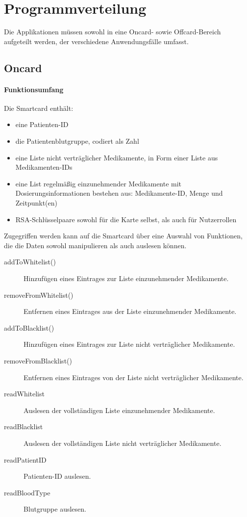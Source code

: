 \documentclass[parskip]{scrartcl}
\begin{document}
	\section{Programmverteilung}
		Die Applikationen müssen sowohl in eine Oncard- sowie Offcard-Bereich aufgeteilt werden, der verschiedene Anwendungsfälle umfasst.

		\subsection{Oncard}
		
			\paragraph{Funktionsumfang}
			Die Smartcard enthält:
			
			\begin{itemize}
				\item eine Patienten-ID
				\item die Patientenblutgruppe, codiert als Zahl
				\item eine Liste nicht verträglicher Medikamente, in Form einer Liste aus Medikamenten-IDs
				\item eine List regelmäßig einzunehmender Medikamente mit Dosierungsinformationen bestehen aus: Medikamente-ID, Menge und Zeitpunkt(en)
				\item RSA-Schlüsselpaare sowohl für die Karte selbst, als auch für Nutzerrollen
			\end{itemize}
		
			Zugegriffen werden kann auf die Smartcard über eine Auswahl von Funktionen, die die Daten sowohl manipulieren als auch auslesen können.
			
			\begin{description}
				\item[addToWhitelist()] Hinzufügen eines Eintrages zur Liste einzunehmender Medikamente.
				\item[removeFromWhitelist()] Entfernen eines Eintrages aus der Liste einzunehmender Medikamente.
				\item[addToBlacklist()] Hinzufügen eines Eintrages zur Liste nicht verträglicher Medikamente.
				\item[removeFromBlacklist()] Entfernen eines Eintrages von der Liste nicht verträglicher Medikamente.
				\item[readWhitelist] Auslesen der vollständigen Liste einzunehmender Medikamente.
				\item[readBlacklist] Auslesen der vollständigen Liste nicht verträglicher Medikamente.
				\item[readPatientID] Patienten-ID auslesen.
				\item[readBloodType] Blutgruppe auslesen.
			\end{description}
			
\end{document}
